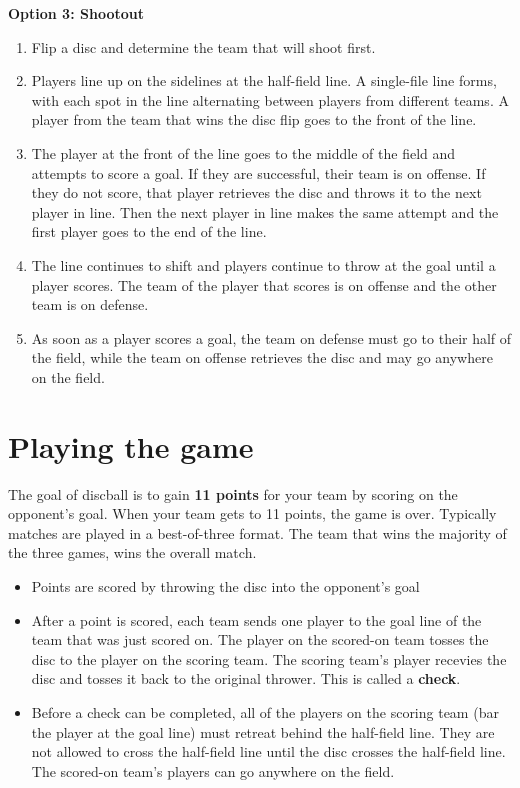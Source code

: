 \documentclass[10pt]{article}
\begin{document}
\textbf{Option 3: Shootout}
\begin{enumerate}
    \item Flip a disc and determine the team that will shoot first.
    \item Players line up on the sidelines at the half-field line. A single-file line forms, with each spot in the line alternating between players from different teams. A player from the team that wins the disc flip goes to the front of the line.
    \item The player at the front of the line goes to the middle of the field and attempts to score a goal. If they are successful, their team is on offense. If they do not score, that player retrieves the disc and throws it to the next player in line. Then the next player in line makes the same attempt and the first player goes to the end of the line.
    \item The line continues to shift and players continue to throw at the goal until a player scores. The team of the player that scores is on offense and the other team is on defense.
    \item As soon as a player scores a goal, the team on defense must go to their half of the field, while the team on offense retrieves the disc and may go anywhere on the field.
\end{enumerate}

\section{Playing the game}

The goal of discball is to gain \textbf{11 points} for your team by scoring on the opponent's goal. When your team gets to 11 points, the game is over. Typically matches are played in a best-of-three format. The team that wins the majority of the three games, wins the overall match.
\begin{itemize}
    \item Points are scored by throwing the disc into the opponent's goal
    \item After a point is scored, each team sends one player to the goal line of the team that was just scored on. The player on the scored-on team tosses the disc to the player on the scoring team. The scoring team's player recevies the disc and tosses it back to the original thrower. This is called a \textbf{check}.
    \item Before a check can be completed, all of the players on the scoring team (bar the player at the goal line) must retreat behind the half-field line. They are not allowed to cross the half-field line until the disc crosses the half-field line. The scored-on team's players can go anywhere on the field.
\end{itemize}
\end{document}
